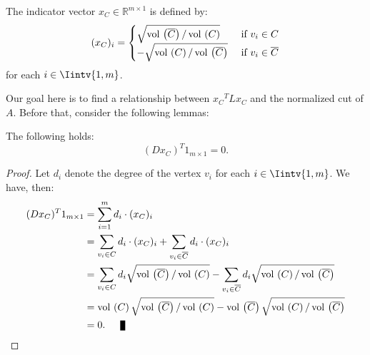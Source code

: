 \begin{definition}
The indicator vector $x_C \in \mathbb R ^{m \times 1}$ is defined by:
   \begin{equation} \label{indicator}
   (x_C)_i =
   \begin{cases}
      \sqrt{ \operatorname*{vol\,}  \left( \overline C \right) / \operatorname*{vol\,} \left( C \right) } &\text{ if } v_i \in C \\
      -\sqrt{\operatorname*{vol\,} \left( C \right) / \operatorname*{vol\,} \left( \overline C \right)} & \text{ if } v_i \in \overline C 
   \end{cases}
\end{equation}
for each $i \in \Iintv{1,m}$.
\end{definition}

Our goal here is to find a relationship between ${x_C}^T L x_C$ and the normalized cut of $A$.
Before that, consider the following lemmas:

\begin{lemma} \label{cond1}
   The following holds:
   \begin{equation}
      (D x_C)^T 1_{m \times 1} = 0.
   \end{equation}
\end{lemma}
\begin{proof}
   Let $d_i$ denote the degree of the vertex $v_i$ for each $i \in \Iintv{1,m}$. We have, then:
   \begin{equation*}
      \begin{split}
         (D x_C)^T 1_{m \times 1} &= \sum_{i=1}^m d_i \cdot (x_C)_i \\
         &= \sum_{v_i \in C} d_i \cdot (x_C)_i + \sum_{v_i \in \overline C} d_i \cdot (x_C)_i \\
         &= \sum_{v_i \in C} d_i \sqrt{\vol \left( \overline C \right) / \vol \left( C \right) } - \sum_{v_i \in \overline C} d_i \sqrt{\vol \left( C \right) / \vol \left( \overline C \right) } \\
         &= \vol \left( C \right) \sqrt{\vol \left( \overline C \right) / \vol \left( C \right) } - \vol \left( \overline C \right) \sqrt{\vol \left( C \right) / \vol \left( \overline C \right) } \\
         &= 0. \qed
      \end{split}
   \end{equation*}
\end{proof}


